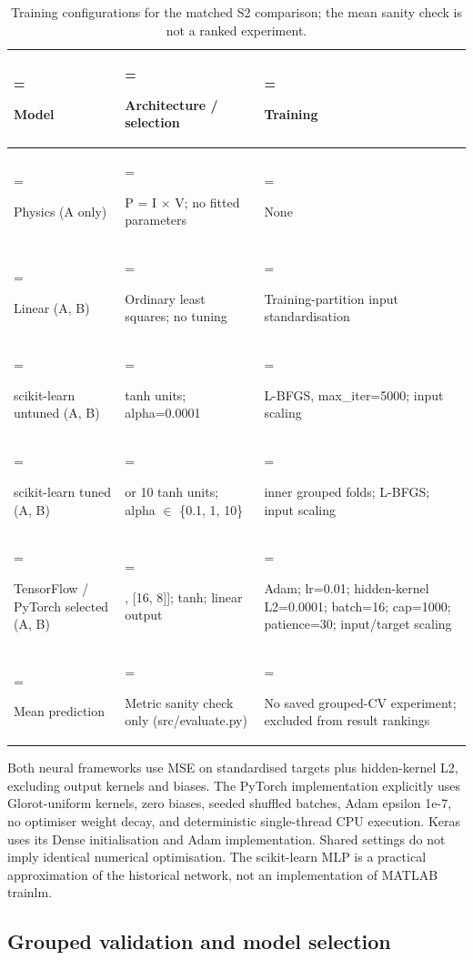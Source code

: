 \documentclass[10pt,journal,twoside]{IEEEtran}
\begin{document}
\begin{table}[!t]
\caption{Training configurations for the matched S2 comparison; the mean sanity check is not a ranked experiment.}
\label{tab:3}
\centering\footnotesize
\setlength{\tabcolsep}{4pt}
\renewcommand{\arraystretch}{1.18}
\begin{tabularx}{\textwidth}{>{\hsize=0.586\hsize\linewidth=\hsize\raggedright\arraybackslash}X >{\hsize=1.034\hsize\linewidth=\hsize\raggedright\arraybackslash}X >{\hsize=1.379\hsize\linewidth=\hsize\raggedright\arraybackslash}X}
\toprule
\textbf{Model} & \textbf{Architecture / selection} & \textbf{Training} \\ \midrule
Physics (A only) & P = I $\times$ V; no fitted parameters & None \\
Linear (A, B) & Ordinary least squares; no tuning & Training-partition input standardisation \\
scikit-learn untuned (A, B) & 10 tanh units; alpha=0.0001 & L-BFGS, max\_iter=5000; input scaling \\
scikit-learn tuned (A, B) & 3 or 10 tanh units; alpha $\in$ \{0.1, 1, 10\} & 3 inner grouped folds; L-BFGS; input scaling \\
TensorFlow / PyTorch selected (A, B) & [[10], [16, 8]]; tanh; linear output & Adam; lr=0.01; hidden-kernel L2=0.0001; batch=16; cap=1000; patience=30; input/target scaling \\
Mean prediction & Metric sanity check only (src/evaluate.py) & No saved grouped-CV experiment; excluded from result rankings \\
\bottomrule\end{tabularx}
\par{}
\end{table}

Both neural frameworks use MSE on standardised targets plus hidden-kernel L2, excluding output kernels and biases. The PyTorch implementation explicitly uses Glorot-uniform kernels, zero biases, seeded shuffled batches, Adam epsilon 1e-7, no optimiser weight decay, and deterministic single-thread CPU execution. Keras uses its Dense initialisation and Adam implementation. Shared settings do not imply identical numerical optimisation. The scikit-learn MLP is a practical approximation of the historical network, not an implementation of MATLAB trainlm.

\subsection{Grouped validation and model selection}
\end{document}
